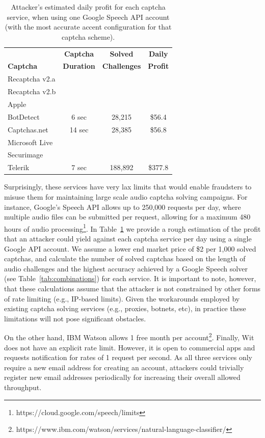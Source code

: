 \begin{table}[t]
\centering
\caption{Attacker's estimated daily profit for each captcha service, when using one Google Speech API account
(with the most accurate accent configuration for that captcha scheme).}
\begin{tabular}{lccc}
\toprule
& \textbf{Captcha} & \textbf{Solved} & \textbf{Daily} \\
\textbf{Captcha}&  \textbf{Duration} & \textbf{Challenges} & \textbf{Profit} \\
\hline
Recaptcha v2.a & & & \\
\rowcolor{Gray}
Recaptcha v2.b & & & \\
Apple  & & & \\
\rowcolor{Gray}
BotDetect  & 6 sec & 28,215 & \$56.4 \\
Captchas.net & 14 sec & 28,385 & \$56.8 \\
\rowcolor{Gray}
Microsoft Live & & & \\
Securimage & & & \\
\rowcolor{Gray}
Telerik & 7 sec & 188,892 & \$377.8 \\
\bottomrule
\end{tabular}
\label{tab:money}
\end{table}

Surprisingly, these services have very lax limits that would enable fraudsters to misuse
them for maintaining large scale audio captcha solving campaigns. For instance, Google's Speech API allows up
to 250,000 requests per day, where multiple audio files can be submitted per request, allowing for a maximum 
480 hours of audio processing\footnote{https://cloud.google.com/speech/limits}. 
In Table~\ref{tab:money} we provide a rough estimation of the profit that an attacker could yield against 
each captcha service per day using a single Google API account. We assume a lower end market price of \$2 
per 1,000 solved captchas, and calculate the number of solved captchas based on the length of audio challenges 
and the highest accuracy achieved by a Google Speech solver (see Table~\ref{tab:combinations}) for each service.
 It is important to note, however, that these calculations assume that the attacker 
is not constrained by other forms of rate limiting (e.g., IP-based limits). Given the workarounds employed
by existing captcha solving services (e.g., proxies, botnets, etc), in practice these limitations will not 
pose significant obstacles.

On the other hand, IBM Watson allows 1 free month per account\footnote{https://www.ibm.com/watson/services/natural-language-classifier/}.
Finally, Wit does not have an explicit rate limit. However, it is open to commercial
apps and requests notification for rates of 1 request per second. As all three services
only require a new email address for creating an account, attackers could trivially register 
new email addresses periodically for increasing their overall allowed throughput.

